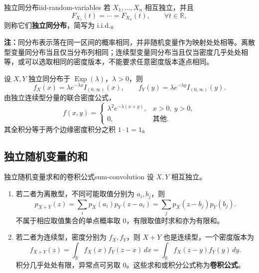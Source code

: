 \begin{mydefinition}{独立同分布}{iid-random-variables}
若 $X_1,\ldots,X_n$ 相互独立，并且
\[
F_{X_1}(t)=\cdots=F_{X_n}(t),\qquad \forall t\in\mathbb R,
\]
则称它们\textbf{独立同分布}，简写为 i.i.d.。
\end{mydefinition}

\textbf{注：}\quad 同分布表示落在同一区间的概率相同，并非随机变量作为映射处处相等。离散型变量同分布当且仅当分布列相同；连续型变量同分布当且仅当密度几乎处处相等，或可以选取相同的密度版本，不能要求任意密度版本逐点相同。

\begin{example}[独立同分布的指数变量的联合密度]
设 $X,Y$ 独立同分布于 $\operatorname{Exp}(\lambda)$，$\lambda>0$，则
\[
f_X(x)=\lambda e^{-\lambda x}I_{(0,\infty)}(x),\qquad
f_Y(y)=\lambda e^{-\lambda y}I_{(0,\infty)}(y).
\]
由独立连续型分量的联合密度公式，
\[
f(x,y)=
\begin{cases}
\lambda^2e^{-\lambda(x+y)},&x>0,\ y>0,\\
0,&\text{其他}.
\end{cases}
\]
其全积分等于两个边缘密度积分之积 $1\cdot1=1$。
\end{example}

\subsection*{独立随机变量的和}

\begin{mytheorem}{独立随机变量求和的卷积公式}{sum-convolution}
设 $X,Y$ 相互独立。
\begin{enumerate}
\item 若二者为离散型，不同可能取值分别为 $a_i,b_j$，则
\[
p_{X+Y}(z)=\sum_i p_X(a_i)p_Y(z-a_i)
=\sum_jp_X(z-b_j)p_Y(b_j).
\]
不属于相应取值集合的单点概率取 $0$，有限取值时求和亦为有限和。
\item 若二者为连续型，密度分别为 $f_X,f_Y$，则 $X+Y$ 也是连续型，一个密度版本为
\[
f_{X+Y}(z)=\int_{\mathbb R}f_X(x)f_Y(z-x)\,dx
=\int_{\mathbb R}f_X(z-y)f_Y(y)\,dy.
\]
积分几乎处处有限，异常点可另取 $0$。这些求和或积分公式称为\textbf{卷积公式}。
\end{enumerate}
\end{mytheorem}


